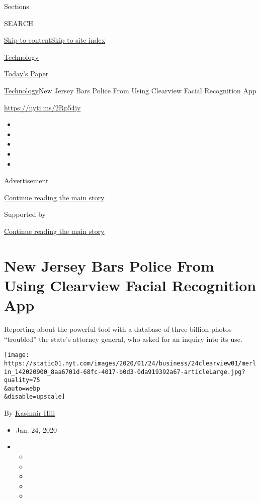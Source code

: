 Sections

SEARCH

\protect\hyperlink{site-content}{Skip to
content}\protect\hyperlink{site-index}{Skip to site index}

\href{https://www.nytimes.com/section/technology}{Technology}

\href{https://myaccount.nytimes.com/auth/login?response_type=cookie\&client_id=vi}{}

\href{https://www.nytimes.com/section/todayspaper}{Today's Paper}

\href{/section/technology}{Technology}\textbar{}New Jersey Bars Police
From Using Clearview Facial Recognition App

\url{https://nyti.ms/2Rp54jv}

\begin{itemize}
\item
\item
\item
\item
\item
\end{itemize}

Advertisement

\protect\hyperlink{after-top}{Continue reading the main story}

Supported by

\protect\hyperlink{after-sponsor}{Continue reading the main story}

\hypertarget{new-jersey-bars-police-from-using-clearview-facial-recognition-app}{%
\section{New Jersey Bars Police From Using Clearview Facial Recognition
App}\label{new-jersey-bars-police-from-using-clearview-facial-recognition-app}}

Reporting about the powerful tool with a database of three billion
photos ``troubled'' the state's attorney general, who asked for an
inquiry into its use.

\texttt{[image: https://static01.nyt.com/images/2020/01/24/business/24clearview01/merlin\_142020900\_8aa6701d-68fc-4017-b0d3-0da919392a67-articleLarge.jpg?quality=75\\\&auto=webp\\\&disable=upscale]}

By \href{https://www.nytimes.com/by/kashmir-hill}{Kashmir Hill}

\begin{itemize}
\item
  Jan. 24, 2020
\item
  \begin{itemize}
  \item
  \item
  \item
  \item
  \item
  \end{itemize}
\end{itemize}

